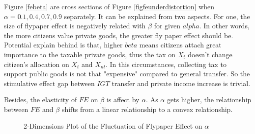 Figure \ref*{febeta} are cross sections of Figure \ref*{figfeunderdistortion} when $\alpha=0.1,0.4,0.7,0.9$ separately. It can be explained from two aspects. For one, the size of flypaper effect is negatively related with $\beta$ for given $alpha$. In other words, the more citizens value private goods, the greater fly paper effect should be. Potential explain behind is that, higher $beta$ means citizens attach great importance to the taxable private goods, thus the tax on $X_t$ doesn't change citizen's allocation on $X_t$ and $X_{nt}$. In this circumstances, collecting tax to support public goods is not that "expensive" compared to general transfer. So the stimulative effect gap between $IGT$ transfer and private income increase is trivial.

Besides, the elasticity of $FE$ on $\beta$ is affect by $\alpha$. As $\alpha$ gets higher, the relationship between $FE$ and $\beta$ shifts from a linear relationship to a convex relationship.



\begin{figure}[H]
    \centering
    \caption{2-Dimensions Plot of the Fluctuation of Flypaper Effect on $\alpha$}
    \label{fealpha}
\end{figure}

